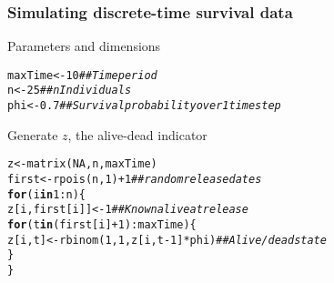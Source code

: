 \documentclass[color=usenames,dvipsnames]{beamer}\usepackage[]{graphicx}\usepackage[]{color}
\makeatletter
\newcommand{\hlnum}[1]{\textcolor[rgb]{0.69,0.494,0}{#1}}%
\newcommand{\hlcom}[1]{\textcolor[rgb]{0.514,0.506,0.514}{\textit{#1}}}%
\newcommand{\hlopt}[1]{\textcolor[rgb]{0,0,0}{#1}}%
\newcommand{\hlstd}[1]{\textcolor[rgb]{0,0,0}{#1}}%
\newcommand{\hlkwa}[1]{\textcolor[rgb]{0,0,0}{\textbf{#1}}}%
\newcommand{\hlkwb}[1]{\textcolor[rgb]{0,0.341,0.682}{#1}}%
\newcommand{\hlkwd}[1]{\textcolor[rgb]{0.004,0.004,0.506}{#1}}%
\newenvironment{kframe}{%
 \def\at@end@of@kframe{}%
 \ifinner\ifhmode%
  \def\at@end@of@kframe{\end{minipage}}%
  \begin{minipage}{\columnwidth}%
 \fi\fi%
 \def\FrameCommand##1{\hskip\@totalleftmargin \hskip-\fboxsep
 \colorbox{shadecolor}{##1}\hskip-\fboxsep
     \hskip-\linewidth \hskip-\@totalleftmargin \hskip\columnwidth}%
 \MakeFramed {\advance\hsize-\width
   \@totalleftmargin\z@ \linewidth\hsize
   \@setminipage}}%
 {\par\unskip\endMakeFramed%
 \at@end@of@kframe}
\newenvironment{knitrout}{}{} %
\makeatother
\begin{document}







\begin{frame}[fragile]
  \frametitle{Simulating discrete-time survival data}
  {%
    Parameters and dimensions}
\begin{knitrout}\footnotesize
{}\color{fgcolor}\begin{kframe}
\begin{alltt}
\hlstd{maxTime} \hlkwb{<-} \hlnum{10}           \hlcom{## Time period}
\hlstd{n} \hlkwb{<-} \hlnum{25}                 \hlcom{## nIndividuals}
\hlstd{phi} \hlkwb{<-} \hlnum{0.7}              \hlcom{## Survival probability over 1 time step}
\end{alltt}
\end{kframe}
\end{knitrout}
\pause
\vfill
{%
  Generate $z$, the alive-dead indicator}
\begin{knitrout}\footnotesize
{}\color{fgcolor}\begin{kframe}
\begin{alltt}
\hlstd{z} \hlkwb{<-} \hlkwd{matrix}\hlstd{(}\hlnum{NA}\hlstd{, n, maxTime)}
\hlstd{first} \hlkwb{<-} \hlkwd{rpois}\hlstd{(n,} \hlnum{1}\hlstd{)}\hlopt{+}\hlnum{1}  \hlcom{## random release dates}
\hlkwa{for}\hlstd{(i} \hlkwa{in} \hlnum{1}\hlopt{:}\hlstd{n) \{}
    \hlstd{z[i,first[i]]} \hlkwb{<-} \hlnum{1}  \hlcom{## Known alive at release}
    \hlkwa{for}\hlstd{(t} \hlkwa{in} \hlstd{(first[i]}\hlopt{+}\hlnum{1}\hlstd{)}\hlopt{:}\hlstd{maxTime) \{}
        \hlstd{z[i,t]} \hlkwb{<-} \hlkwd{rbinom}\hlstd{(}\hlnum{1}\hlstd{,} \hlnum{1}\hlstd{, z[i,t}\hlopt{-}\hlnum{1}\hlstd{]}\hlopt{*}\hlstd{phi)} \hlcom{## Alive/dead state}
    \hlstd{\}}
\hlstd{\}}
\end{alltt}
\end{kframe}
\end{knitrout}
\end{frame}
\end{document}
